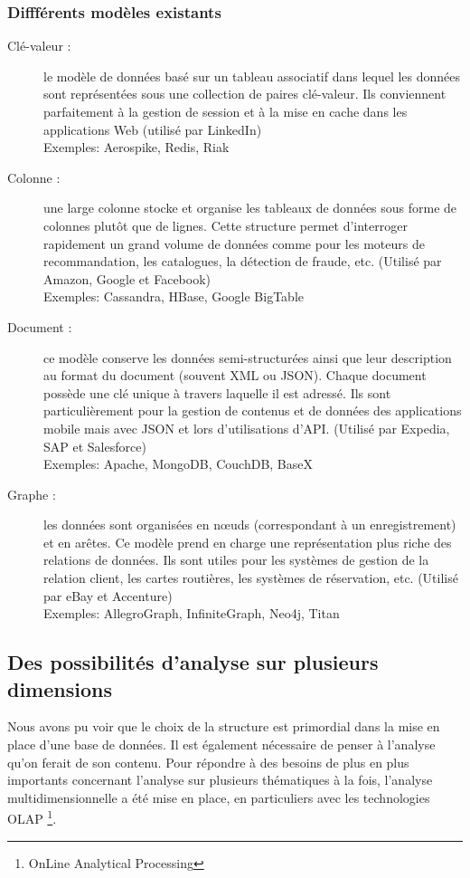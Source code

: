 \subsubsection{Diffférents modèles existants}
\begin{description}
    \item[Clé-valeur \supercite{NoSQLModels} :] le modèle de données basé sur un tableau associatif dans lequel les données sont représentées sous une collection de paires clé-valeur. Ils conviennent parfaitement à la gestion de session et à la mise en cache dans les applications Web (utilisé par LinkedIn)\\
    Exemples: Aerospike,  Redis, Riak\\
    \item[Colonne :] une large colonne stocke et organise les tableaux de données sous forme de colonnes plutôt que de lignes. Cette structure permet d’interroger rapidement un grand volume de données comme pour les moteurs de recommandation, les catalogues, la détection de fraude, etc. (Utilisé par Amazon, Google et Facebook) \\
    Exemples: Cassandra, HBase, Google BigTable\\
    \item[Document :] ce modèle conserve les données semi-structurées ainsi que leur description au format du document (souvent XML ou JSON). Chaque document possède une clé unique à travers laquelle il est adressé. Ils sont particulièrement pour la gestion de contenus et de données des applications mobile mais avec JSON et lors d’utilisations d’API. (Utilisé par Expedia, SAP et Salesforce) \\
Exemples: Apache, MongoDB, CouchDB, BaseX\\
    \item[Graphe :] les données sont organisées en nœuds (correspondant à un enregistrement) et en arêtes. Ce modèle prend en charge une représentation plus riche des relations de données. Ils sont utiles pour les systèmes de gestion de la relation client, les cartes routières, les systèmes de réservation, etc. (Utilisé par eBay et Accenture)\\
Exemples: AllegroGraph, InfiniteGraph,  Neo4j, Titan\\
\end{description}
\subsection{Des possibilités d'analyse sur plusieurs dimensions}
Nous avons pu voir que le choix de la structure est primordial dans la mise en place d'une base de données. Il est également nécessaire de penser à l'analyse qu'on ferait de son contenu. Pour répondre à des besoins de plus en plus importants concernant l'analyse sur plusieurs thématiques à la fois, l'analyse multidimensionnelle a été mise en place, en particuliers avec les technologies OLAP \footnote{OnLine Analytical Processing}.

